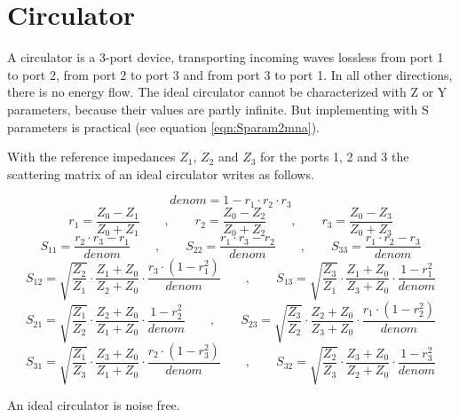 \section{Circulator}
\label{sec:CirculatorSparameter}

A circulator is a 3-port device, transporting incoming waves lossless
from port 1 to port 2, from port 2 to port 3 and from port 3 to port
1.  In all other directions, there is no energy flow.
The ideal circulator cannot be characterized with Z or Y parameters,
because their values are partly infinite.  But implementing with S
parameters is practical (see equation \ref{eqn:Sparam2mna}).

\addvspace{12pt}

With the
reference impedances $Z_1$, $Z_2$ and $Z_3$ for the ports 1, 2 and 3
the scattering matrix of an ideal circulator writes as follows.

\begin{equation}
denom = 1-r_1\cdot r_2\cdot r_3
\end{equation}
\begin{equation}
r_1 = \frac{Z_0-Z_1}{Z_0+Z_1} \qquad,\qquad 
r_2 = \frac{Z_0-Z_2}{Z_0+Z_2} \qquad,\qquad 
r_3 = \frac{Z_0-Z_3}{Z_0+Z_3}
\end{equation}
\begin{equation}
S_{11} = \frac{r_2\cdot r_3 - r_1}{denom} \qquad,\qquad
S_{22} = \frac{r_1\cdot r_3 - r_2}{denom} \qquad,\qquad 
S_{33} = \frac{r_1\cdot r_2 - r_3}{denom}
\end{equation}
\begin{equation}
S_{12} = \sqrt{\frac{Z_2}{Z_1}}\cdot\frac{Z_1+Z_0}{Z_2+Z_0}\cdot\frac{r_3\cdot(1-r_1^2)}{denom}
\qquad,\qquad 
S_{13} = \sqrt{\frac{Z_3}{Z_1}}\cdot\frac{Z_1+Z_0}{Z_3+Z_0}\cdot\frac{1-r_1^2}{denom}
\end{equation}
\begin{equation}
S_{21} = \sqrt{\frac{Z_1}{Z_2}}\cdot\frac{Z_2+Z_0}{Z_1+Z_0}\cdot\frac{1-r_2^2}{denom}
\qquad,\qquad 
S_{23} = \sqrt{\frac{Z_3}{Z_2}}\cdot\frac{Z_2+Z_0}{Z_3+Z_0}\cdot\frac{r_1\cdot(1-r_2^2)}{denom}
\end{equation}
\begin{equation}
S_{31} = \sqrt{\frac{Z_1}{Z_3}}\cdot\frac{Z_3+Z_0}{Z_1+Z_0}\cdot\frac{r_2\cdot(1-r_3^2)}{denom}
\qquad,\qquad 
S_{32} = \sqrt{\frac{Z_2}{Z_3}}\cdot\frac{Z_3+Z_0}{Z_2+Z_0}\cdot\frac{1-r_3^2}{denom}
\end{equation}

An ideal circulator is noise free.


